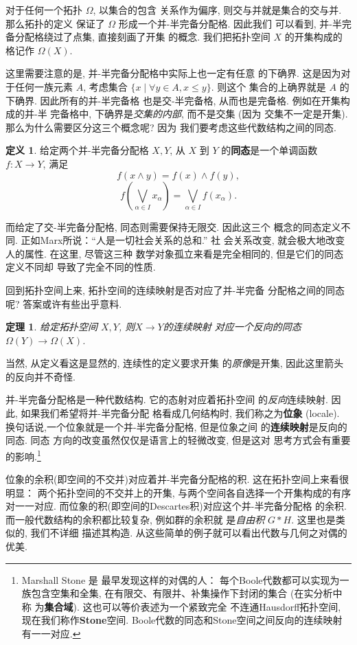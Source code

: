 \documentclass[UTF8]{ctexbook}
\theoremstyle{plain}
\newtheorem{theorem}{定理}[chapter]
\theoremstyle{definition}
\newtheorem{definition}{定义}[chapter]
\theoremstyle{remark}
\begin{document}
对于任何一个拓扑 \(\Omega\), 以集合的包含
关系作为偏序, 则交与并就是集合的交与并. 那么拓扑的定义
保证了 \(\Omega\) 形成一个并-半完备分配格. 因此我们
可以看到, 并-半完备分配格绕过了点集, 直接刻画了开集
的概念. 我们把拓扑空间 \(X\) 的开集构成的格记作 \(\Omega(X)\).

这里需要注意的是, 并-半完备分配格中实际上也一定有任意
的下确界. 这是因为对于任何一族元素 \(A\), 考虑集合
\(\{x \mid \forall y \in A, x \le y\}\). 则这个
集合的上确界就是 \(A\) 的下确界. 因此所有的并-半完备格
也是交-半完备格, 从而也是完备格. 例如在开集构成的并-半
完备格中, 下确界是\emph{交集的内部}, 而不是交集 (因为
交集不一定是开集). 那么为什么需要区分这三个概念呢? 因为
我们要考虑这些代数结构之间的同态.

\begin{definition}
给定两个并-半完备分配格 \(X, Y\), 从 \(X\) 到 \(Y\)
的\textbf{同态}是一个单调函数 \(f : X \to Y\), 满足
\[f(x\wedge y) = f(x) \wedge f(y),\]
\[f\left(\bigvee_{\alpha \in I} x_\alpha\right)
= \bigvee_{\alpha \in I} f(x_\alpha).\]
\end{definition}

而给定了交-半完备分配格, 同态则需要保持无限交. 因此这三个
概念的同态定义不同. 正如Marx所说：“人是一切社会关系的总和.” 社
会关系改变, 就会极大地改变人的属性. 在这里, 尽管这三种
数学对象孤立来看是完全相同的, 但是它们的同态定义不同却
导致了完全不同的性质.

回到拓扑空间上来, 拓扑空间的连续映射是否对应了并-半完备
分配格之间的同态呢? 答案或许有些出乎意料.
\begin{theorem}
给定拓扑空间 \(X, Y\), 则\(X \to Y\)的连续映射
对应一个反向的同态 \(\Omega(Y) \to \Omega(X)\).
\end{theorem}
当然, 从定义看这是显然的, 连续性的定义要求开集
的\emph{原像}是开集, 因此这里箭头的反向并不奇怪.

并-半完备分配格是一种代数结构. 它的态射对应着拓扑空间
的\emph{反向}连续映射. 因此, 如果我们希望将并-半完备分配
格看成几何结构时, 我们称之为\textbf{位象} (locale).
换句话说,一个位象就是一个并-半完备分配格, 但是位象之间
的\textbf{连续映射}是反向的同态. 同态
方向的改变虽然仅仅是语言上的轻微改变, 但是这对
思考方式会有重要的影响.\footnote{Marshall Stone 是
最早发现这样的对偶的人： 每个Boole代数都可以实现为一族包含空集和全集,
在有限交、有限并、补集操作下封闭的集合 (在实分析中称
为\textbf{集合域}). 这也可以等价表述为一个紧致完全
不连通Hausdorff拓扑空间, 现在我们称作\textbf{Stone}空间.
Boole代数的同态和Stone空间之间反向的连续映射有一一对应.}

位象的余积(即空间的不交并)对应着并-半完备分配格的积.
这在拓扑空间上来看很明显： 两个拓扑空间的不交并上的开集,
与两个空间各自选择一个开集构成的有序对一一对应.
而位象的积(即空间的Descartes积)对应这个并-半完备分配格
的余积. 而一般代数结构的余积都比较复杂, 例如群的余积就
是\emph{自由积} \(G * H\). 这里也是类似的, 我们不详细
描述其构造. 从这些简单的例子就可以看出代数与几何之对偶的
优美.
\end{document}
